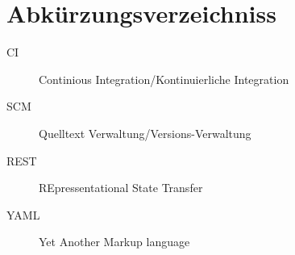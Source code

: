 
\section{Abkürzungsverzeichniss}
\begin{description}
    \item[CI] Continious Integration/Kontinuierliche Integration
    \item[SCM] Quelltext Verwaltung/Versions-Verwaltung
    \item[REST] REpressentational State Transfer \cite{rest:definition}
    \item[YAML] Yet Another Markup language \cite{yaml:website}
\end{description}